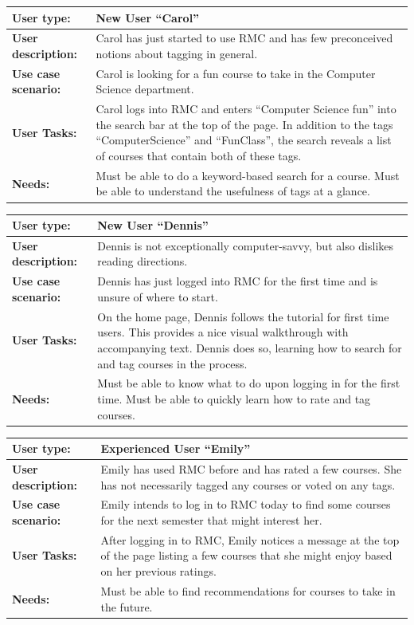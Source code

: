 \documentclass[12pt]{report}
\begin{document}
\begin{tabular}{|l|p{8cm}|}
\hline
\textbf{User type:}	&  New User ``Carol''\\
\hline
\textbf{User description:}	&  Carol has just started to use RMC and has few preconceived notions about tagging in general. \\
\hline
\textbf{Use case scenario:}	&  Carol is looking for a fun course to take in the Computer Science department. \\
\hline
\textbf{User Tasks:}	&  Carol logs into RMC and enters ``Computer Science fun'' into the search bar at the top of the page. In addition to the tags ``ComputerScience'' and ``FunClass'', the search reveals a list of courses that contain both of these tags.\\
\hline
\textbf{Needs: }	& Must be able to do a keyword-based search for a course. Must be able to understand the usefulness of tags at a glance.\\
\hline
\end{tabular}

\bigskip

\begin{tabular}{|l|p{8cm}|}
\hline
\textbf{User type:}	&  New User ``Dennis''\\
\hline
\textbf{User description:}	&  Dennis is not exceptionally computer-savvy, but also dislikes reading directions. \\
\hline
\textbf{Use case scenario:}	&  Dennis has just logged into RMC for the first time and is unsure of where to start. \\
\hline
\textbf{User Tasks:}	& On the home page, Dennis follows the tutorial for first time users. This provides a nice visual walkthrough with accompanying text. Dennis does so, learning how to search for and tag courses in the process. \\
\hline
\textbf{Needs: }	& Must be able to know what to do upon logging in for the first time. Must be able to quickly learn how to rate and tag courses.
\\
\hline
\end{tabular}

\bigskip

\begin{tabular}{|l|p{8cm}|}
\hline
\textbf{User type:}	&  Experienced User ``Emily''\\
\hline
\textbf{User description:}	&  Emily has used RMC before and has rated a few courses. She has not necessarily tagged any courses or voted on any tags. \\
\hline
\textbf{Use case scenario:}	&  Emily intends to log in to RMC today to find some courses for the next semester that might interest her. \\
\hline
\textbf{User Tasks:}	&  After logging in to RMC, Emily notices a message at the top of the page listing a few courses that she might enjoy based on her previous ratings. \\
\hline
\textbf{Needs: }	& Must be able to find recommendations for courses to take in the future. \\
\hline
\end{tabular}
\end{document}
